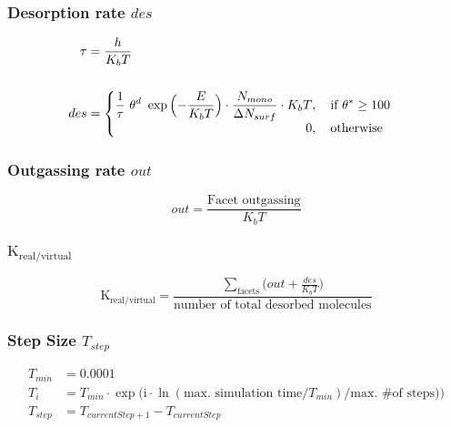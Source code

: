 \subsubsection*{Desorption rate $des$}
\begin{equation}
	\label{eq:des}
	\begin{split}
	\tau&=\frac{h}{K_b T}\\
	&\\
	des&=
	\begin{cases}
		\begin{split}
		\frac{1}{\tau}\ \theta^d\ \exp\Big({-\frac{E}{K_b T}}\Big)\cdot \frac{N_{mono}}{\Delta N_{surf}}\cdot K_b T&, \text{\quad if}\ \theta^* \geq 100\\
		0&,  \text{\quad otherwise}
		\end{split}
	\end{cases}
	\end{split}
\end{equation}

\subsubsection*{Outgassing rate $out$}
\begin{equation}
	\label{eq:out}
	out=\frac{\text{Facet outgassing}}{K_b T}
\end{equation}

\subsubsection*{$\text{K}_{\text{real}/\text{virtual}}$}
\begin{equation}
	\label{eq:krealvirt}
	\text{K}_{\text{real}/\text{virtual}}=\frac{\sum\limits_{\text{facets}}\Big(out + \frac{des}{K_b T}\Big)}{\text{number of total desorbed molecules}}
\end{equation}


\subsubsection*{Step Size $T_{step}$}
\begin{equation}
	\label{eq:tstep}
	\begin{split}
	T_{min}&=0.0001\\
	T_{i}&=T_{min} \cdot \exp\Big(\text{i}\cdot \ln(\text{max. simulation time}/T_{min})/\text{max. \# of steps})\Big)\\
	T_{step}&=T_{currentStep+1}-T_{currentStep}\\
	\end{split}
\end{equation}

